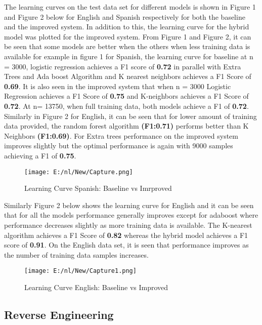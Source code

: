 \documentclass[10pt,a4paper]{article}
\begin{document}
The learning curves on the test data set for different models is shown in Figure 1 and Figure 2 below for English and Spanish respectively for both the baseline and the improved system. In addition to this, the learning curve for the hybrid model was plotted for the improved system.  From Figure 1 and Figure 2, it can be seen that some models are better when the others when less training data is available for example in figure 1 for Spanish, the learning curve for baseline at n = 3000, logistic regression achieves a F1 score of \textbf{0.72} in parallel with Extra Trees and Ada boost Algorithm and K nearest neighbors achieves a F1 Score of \textbf{0.69}. It is also seen in the improved system that when n = 3000 Logistic Regression achieves a F1 Score of \textbf{0.75} and K-neighbors achieves a F1 Score of \textbf{ 0.72}. At n= 13750, when full training data, both models achieve a F1 of \textbf{0.72}. Similarly in Figure 2 for English, it can be seen that for lower amount of training data provided, the random forest algorithm \textbf{(F1:0.71)} performs better than K Neighbors \textbf{(F1:0.69)}. For Extra trees performance on the improved system improves slightly but the optimal performance is again with 9000 samples achieving a F1 of \textbf{0.75}.

\begin{figure}[!htbp]

\hspace*{0cm}\texttt{[image: E:/nl/New/Capture.png]}
\caption{Learning Curve Spanish: Baseline vs Imrproved }

\end{figure}
 
Similarly Figure 2 below shows the learning curve for English and it can be seen that for all the models performance generally improves except for adaboost where performance decreases slightly as more training data is available. The K-nearest algorithm achieves a F1 Score of \textbf{0.82} whereas the hybrid model achieves a F1 score of \textbf{0.91}. On the English data set, it is seen that performance improves as the number of training data samples increases.

\begin{figure}[!htbp]
\hspace*{-2cm}\texttt{[image: E:/nl/New/Capture1.png]}
\caption{Learning Curve English: Baseline vs Improved }
\end{figure}


\subsection{Reverse Engineering}
\label{ssec:layout}
\end{document}
